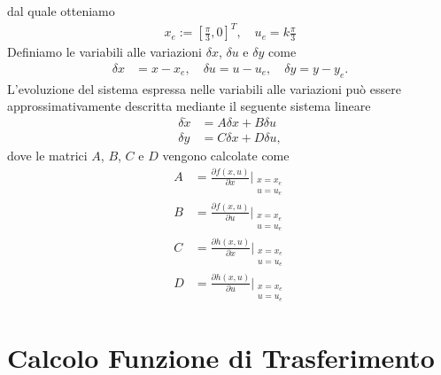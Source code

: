 \documentclass[a4paper, 11pt]{article}
\begin{document}
%
dal quale otteniamo
%
\begin{align}
	x_e := \left[\frac{\pi}{3}, 0\right]^T,  \quad u_e = k\frac{\pi}{3}\label{eq:equilibirum_pair}
\end{align}
%
Definiamo le variabili alle variazioni $\delta x$, $\delta u$ e $\delta y$ come 
%
\begin{align*}
	\delta x &= x-x_e, 
	\quad
	\delta u = u-u_e, 
	\quad
	\delta y = y-y_e.
\end{align*}
%
L'evoluzione del sistema espressa nelle variabili alle variazioni pu\`o essere approssimativamente descritta mediante il seguente sistema lineare
%
\begin{subequations}\label{eq:linearized_system}
\begin{align}
	\delta \dot{x} &= A\delta x + B\delta u
	\\
	\delta y &= C\delta x + D\delta u,
\end{align}
\end{subequations}
%
dove le matrici $A$, $B$, $C$ e $D$ vengono calcolate come
%
\begin{subequations}\label{eq:matrices}
\begin{align}
	A &= \frac{\partial f(x, u)}{\partial x} \Bigg|_{\begin{smallmatrix}
		x = x_e
		\\
		u = u_e \end{smallmatrix}}
	\\
	B &= \frac{\partial f(x, u)}{\partial u} \Bigg|_{\begin{smallmatrix}
		x = x_e
		\\
		u = u_e \end{smallmatrix}}
	\\
	C &= \frac{\partial h(x, u)}{\partial x} \Bigg|_{\begin{smallmatrix}
		x = x_e
		\\
		u = u_e \end{smallmatrix}}
	\\
	D &= \frac{\partial h(x, u)}{\partial u} \Bigg|_{\begin{smallmatrix}
		x = x_e
		\\
		u = u_e \end{smallmatrix}}
\end{align}
\end{subequations}
%
\section{Calcolo Funzione di Trasferimento}
\end{document}
